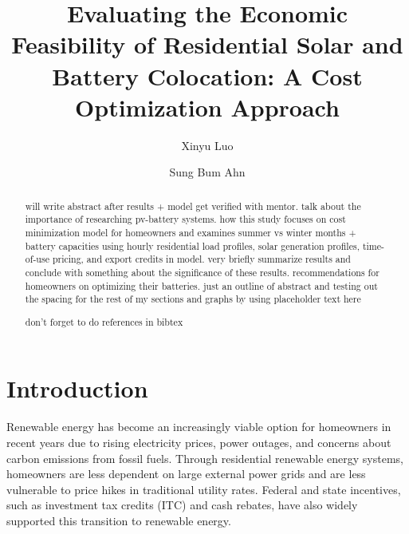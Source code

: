 \documentclass[14pt, final,numbered]{ifacconf}
\begin{document}
\begin{frontmatter}

\title{Evaluating the Economic Feasibility of Residential Solar and Battery Colocation: A Cost Optimization Approach}


\author{Xinyu Luo}
\address{Institute for Computing in Research}

\author{Sung Bum Ahn}
\address{Electric Reliability Council of Texas, Taylor TX}

\begin{abstract}
will write abstract after results + model get verified with mentor. 
talk about the importance of researching pv-battery systems. how this study focuses on cost minimization model for homeowners and examines summer vs winter months + battery capacities using hourly residential load profiles, solar generation profiles, time-of-use pricing, and export credits in model. very briefly summarize results and conclude with something about the significance of these results. recommendations for homeowners on optimizing their batteries. just an outline of abstract and testing out the spacing for the rest of my sections and graphs by using placeholder text here

don't forget to do references in bibtex
\end{abstract}

\end{frontmatter}
\section{Introduction}
Renewable energy has become an increasingly viable option for homeowners in recent years due to rising electricity prices, power outages, and concerns about carbon emissions from fossil fuels. Through residential renewable energy systems, homeowners are less dependent on large external power grids and are less vulnerable to price hikes in traditional utility rates. Federal and state incentives, such as investment tax credits (ITC) and cash rebates, have also widely supported this transition to renewable energy. 
\end{document}
